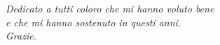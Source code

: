 \vspace{17cm}



\begin{flushright}
\itshape{Dedicato a tutti coloro che mi hanno voluto bene \\
e che mi hanno sostenuto in questi anni.\\
Grazie.}
\end{flushright}